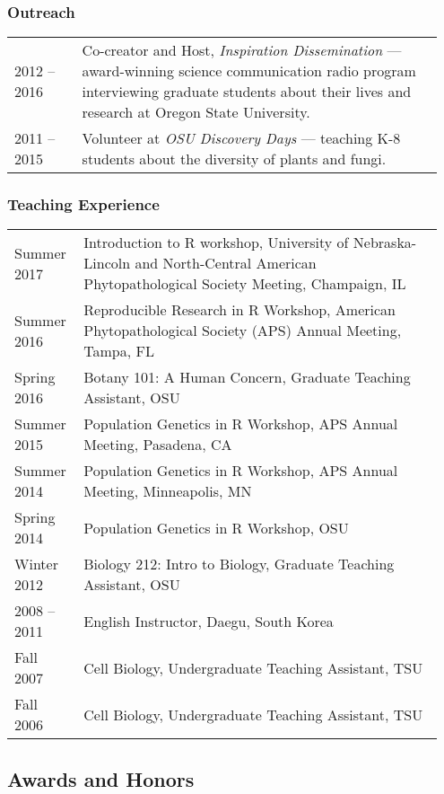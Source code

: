 \documentclass[12pt,letterpaper]{article}
\begin{document}
\subsubsection*{Outreach}

\begin{tabular}{p{0.15\linewidth}p{0.8\linewidth}}
2012 -- 2016 & Co-creator and Host, \textit{Inspiration Dissemination} --- 
			   award-winning science communication radio program interviewing 
			   graduate students about their lives and research at Oregon State 
			   University.\\
2011 -- 2015 & Volunteer at \textit{OSU Discovery Days} --- teaching K-8 students
               about the diversity of plants and fungi.
\end{tabular}

\subsubsection*{Teaching Experience}

\begin{tabular}{p{0.15\linewidth}p{0.8\linewidth}}
Summer 2017  & Introduction to R workshop, University of Nebraska-Lincoln and 
			   North-Central American Phytopathological Society Meeting,
			   Champaign, IL\\
Summer 2016  & Reproducible Research in R Workshop, American Phytopathological 
			   Society (APS) Annual Meeting, Tampa, FL\\
Spring 2016  & Botany 101: A Human Concern, Graduate Teaching Assistant, OSU\\
Summer 2015  & Population Genetics in R Workshop, APS Annual Meeting, Pasadena, CA\\
Summer 2014  & Population Genetics in R Workshop, APS Annual Meeting, Minneapolis, MN\\
Spring 2014  & Population Genetics in R Workshop, OSU\\
Winter 2012  & Biology 212: Intro to Biology, Graduate Teaching Assistant, OSU\\
2008 -- 2011 & English Instructor, Daegu, South Korea\\
Fall 2007    & Cell Biology, Undergraduate Teaching Assistant, TSU\\
Fall 2006    & Cell Biology, Undergraduate Teaching Assistant, TSU
\end{tabular}


\subsection*{Awards and Honors}
\end{document}
